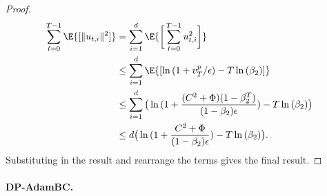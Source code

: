 \documentclass[letterpaper]{article} %
\begin{document}
\begin{proof}
    \begin{align*}
        \sum_{t=0}^{T-1} \E{[\lVert u_{t, i} \rVert^2]} &= \sum_{i=1}^{d} \E{\bigg[ \sum_{t=0}^{T-1} u_{t, i}^2 \bigg]} \\ &\leq \sum_{i=1}^{d} \E{[\ln{(1+v_{T}^p/\epsilon)} - T\ln{(\beta_2)}]} \\
        &\leq \sum_{i=1}^{d} \big(\ln{(1+\frac{(C^2+\Phi)(1-\beta_2^{T})}{(1-\beta_2)\epsilon}) - T\ln{(\beta_2)}}\big)\\
        &\leq d\big(\ln{(1+\frac{C^2+\Phi}{(1-\beta_2)\epsilon}) - T\ln{(\beta_2)}}\big).
    \end{align*}
    Substituting in the result and rearrange the terms gives the final result.

\end{proof}

\paragraph{DP-AdamBC.}
\end{document}
